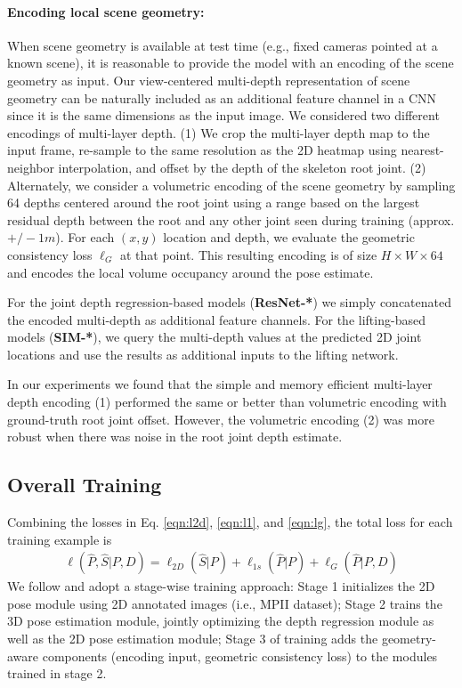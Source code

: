 \documentclass[times,referee,twocolumn,final,authoryear]{elsarticle}
\begin{document}
\paragraph{Encoding local scene geometry:}
When scene geometry is available at test time (e.g., fixed cameras pointed at a
known scene), it is reasonable to provide the model with an encoding of the
scene geometry as input. Our view-centered multi-depth representation of scene 
geometry can be naturally included as an additional feature channel in a CNN
since it is the same dimensions as the input image. 
We considered two different encodings of multi-layer depth. (1) We crop the
multi-layer depth map to the input frame, re-sample to the same resolution as the 2D
heatmap using nearest-neighbor interpolation, and offset by the depth of the
skeleton root joint.  (2) Alternately, we consider a volumetric encoding of the 
scene geometry by sampling 64 depths centered around the root joint using a range 
based on the largest residual depth between the root and any other joint seen during 
training (approx. $+/- 1m$). For each $(x,y)$ location and depth, we evaluate the 
geometric consistency loss $\ell_G$ at that point. This resulting encoding is
of size $H \times W \times 64$ and encodes the local volume occupancy around
the pose estimate. 

For the joint depth regression-based models ({\bf ResNet-*}) we simply concatenated the 
encoded multi-depth as additional feature channels.  For the lifting-based models
({\bf SIM-*}), we query the multi-depth values at the predicted 2D joint locations 
and use the results as additional inputs to the lifting network.

In our experiments we found that the simple and memory efficient multi-layer depth 
encoding (1) performed the same or better than volumetric encoding with ground-truth 
root joint offset. However, the volumetric encoding (2) was more robust when there was 
noise in the root joint depth estimate.

\subsection{Overall Training}

Combining the losses in Eq.  \ref{eqn:l2d}, \ref{eqn:l1}, and
\ref{eqn:lg}, the total loss for each training example is 
\begin{equation*}
\begin{aligned} 
 \ell({\hat P},{\hat S} | P,D) = \ell_{2D}({\hat S}|P) + \ell_{1s}({\hat P}|P) + \ell_{G}({\hat P}|P,D)
\end{aligned}
\end{equation*}
We follow \cite{Zhou_2017_ICCV} and adopt a stage-wise training approach: Stage
1 initializes the 2D pose module using 2D annotated images (i.e., MPII dataset);
Stage 2 trains the 3D pose estimation module, jointly optimizing the depth regression
module as well as the 2D pose estimation module; Stage 3 of training adds the
geometry-aware components (encoding input, geometric consistency loss) to the 
modules trained in stage 2.
\end{document}
